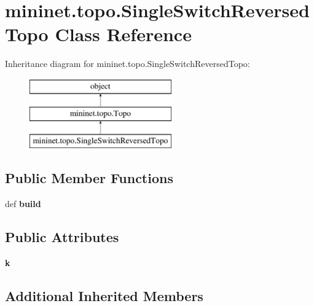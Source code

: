 \hypertarget{classmininet_1_1topo_1_1SingleSwitchReversedTopo}{\section{mininet.\-topo.\-Single\-Switch\-Reversed\-Topo Class Reference}
\label{classmininet_1_1topo_1_1SingleSwitchReversedTopo}
}
Inheritance diagram for mininet.\-topo.\-Single\-Switch\-Reversed\-Topo\-:\begin{figure}[H]
\begin{center}
\leavevmode
\includegraphics[height=3.000000cm]{classmininet_1_1topo_1_1SingleSwitchReversedTopo}
\end{center}
\end{figure}
\subsection*{Public Member Functions}
\begin{DoxyCompactItemize}
\item 
\hypertarget{classmininet_1_1topo_1_1SingleSwitchReversedTopo_a5c36c11d157b32993458c40ca8acca3d}{def {\bfseries build}}\label{classmininet_1_1topo_1_1SingleSwitchReversedTopo_a5c36c11d157b32993458c40ca8acca3d}

\end{DoxyCompactItemize}
\subsection*{Public Attributes}
\begin{DoxyCompactItemize}
\item 
\hypertarget{classmininet_1_1topo_1_1SingleSwitchReversedTopo_a21e1290c70d844b13bbcc50d5939b8f2}{{\bfseries k}}\label{classmininet_1_1topo_1_1SingleSwitchReversedTopo_a21e1290c70d844b13bbcc50d5939b8f2}

\end{DoxyCompactItemize}
\subsection*{Additional Inherited Members}


